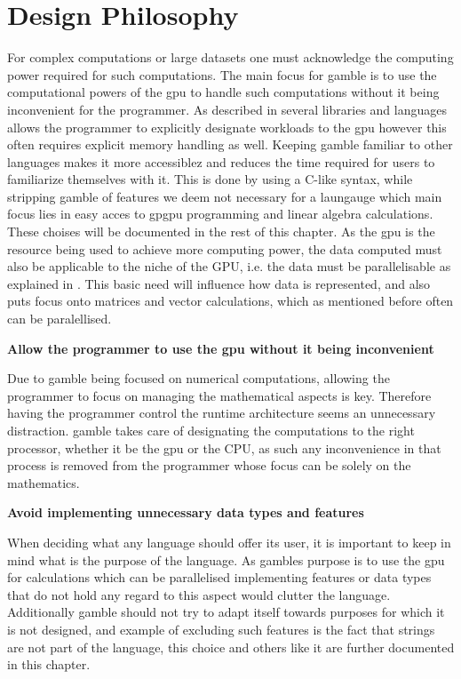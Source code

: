 \section{Design Philosophy}
For complex computations or large datasets one must acknowledge the computing power required for such computations.
The main focus for \gls{gamble} is to use the computational powers of the \acrshort{gpu} to handle such computations without it being inconvenient for the programmer.
As described in  several libraries and languages allows the programmer to explicitly designate workloads to the \acrshort{gpu} however this often requires explicit memory handling as well.
Keeping \gls{gamble} familiar to other languages makes it more accessiblez and reduces the time required for users to familiarize themselves with it.
This is done by using a C-like syntax, while stripping \gls{gamble} of features we deem not necessary for a laungauge which main focus lies in easy acces to \acrshort{gpgpu} programming and linear algebra calculations.
These choises will be documented in the rest of this chapter.
As the \acrshort{gpu} is the resource being used to achieve more computing power, the data computed must also be applicable to the niche of the GPU, i.e. the data must be parallelisable as explained in .
This basic need will influence how data is represented, and also puts focus onto matrices and vector calculations, which as mentioned before often can be paralellised.

\textbf{Allow the programmer to use the \acrshort{gpu} without it being inconvenient}

Due to \gls{gamble} being focused on numerical computations, allowing the programmer to focus on managing the mathematical aspects is key.
Therefore having the programmer control the runtime architecture seems an unnecessary distraction.
\gls{gamble} takes care of designating the computations to the right processor, whether it be the \acrshort{gpu} or the CPU, as such any inconvenience in that process is removed from the programmer whose focus can be solely on the mathematics.

\textbf{Avoid implementing unnecessary data types and features}

When deciding what any language should offer its user, it is important to keep in mind what is the purpose of the language.
As \glspl{gamble} purpose is to use the \acrshort{gpu} for calculations which can be parallelised implementing features or data types that do not hold any regard to this aspect would clutter the language.
Additionally \gls{gamble} should not try to adapt itself towards purposes for which it is not designed, and example of excluding such features is the fact that strings are not part of the language, this choice and others like it are further documented in this chapter.

